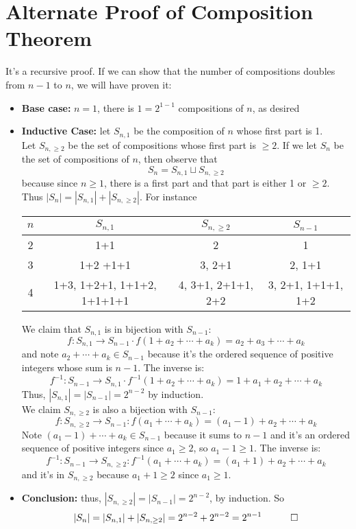 \documentclass{report}
\begin{document}
\section{Alternate Proof of Composition Theorem}
It's a recursive proof. If we can show that the number of compositions doubles from $n-1$ to $n$, we will have proven it:
\begin{itemize}
\item \textbf{Base case:} $n=1$, there is $1 = 2^{1-1}$ compositions of $n$, as desired
\item \textbf{Inductive Case:} let $S_{n,1}$ be the composition of $n$ whose first part is 1.\\Let $S_{n,\geq 2}$ be the set of compositions whose first part is $\geq 2$. If we let $S_n$ be the set of compositions of $n$, then observe that $$S_n = S_{n,1} \sqcup S_{n, \geq 2}$$ because since $n \geq 1$, there is a first part and that part is either 1 or $\geq 2$. Thus $|S_n| = |S_{n,1}| + |S_{n, \geq 2}|$. For instance
\begin{center}
\begin{tabular}{ c | c | c | c }
$n$ & $S_{n,1}$ & $S_{n ,\geq 2}$ & $S_{n-1}$ \\\hline
2 & 1+1 & 2 & 1 \\
3 & 1+2 \newline 1+1+1 & 3, 2+1 & 2, 1+1\\
4 & 1+3, 1+2+1, 1+1+2, 1+1+1+1 & 4, 3+1, 2+1+1, 2+2 & 3, 2+1, 1+1+1, 1+2\\
\end{tabular}
\end{center}
We claim that $S_{n,1}$ is in bijection with $S_{n-1}$:
$$f: S_{n,1} \rightarrow S_{n-1}\cdot f(1 + a_2 + \cdots + a_k) = a_2 + a_3 + \cdots + a_k$$
and note $a_2 + \cdots + a_k \in S_{n-1}$ because it's the ordered sequence of positive integers whose sum is $n-1$. The inverse is:
$$f^{-1}: S_{n-1} \rightarrow S_{n, 1}\cdot f^{-1}(1 + a_2 + \cdots + a_k) = 1 + a_1 + a_2 + \cdots + a_k$$
Thus, $|S_{n,1}| = |S_{n-1}| = 2^{n-2}$ by induction.\\We claim $S_{n, \geq 2}$ is also a bijection with $S_{n-1}$:
$$f: S_{n ,\geq 2} \rightarrow S_{n-1} : f(a_1 + \cdots + a_k) = (a_1 - 1) + a_2 + \cdots + a_k$$ Note $(a_1 - 1) + \cdots + a_k \in S_{n-1}$ because it sums to $n-1$ and it's an ordered sequence of positive integers since $a_1 \geq 2$, so $a_1 - 1 \geq 1$. The inverse is:
$$f^{-1}: S_{n -1} \rightarrow S_{n, \geq 2} : f^{-1}(a_1 + \cdots + a_k) = (a_1 + 1) + a_2 + \cdots + a_k$$
and it's in $S_{n, \geq 2}$ because $a_1 + 1 \geq 2$ since $a_1 \geq 1$.
\item \textbf{Conclusion:} thus, $|S_{n, \geq 2}| = |S_{n-1}| = 2^{n-2}$, by induction. So
$$|S_n| = |S_{n ,1}| + |S_{n, \geq 2}| = 2^{n-2} + 2^{n-2} = 2^{n-1} \quad \qed$$
\end{itemize}
\end{document}
